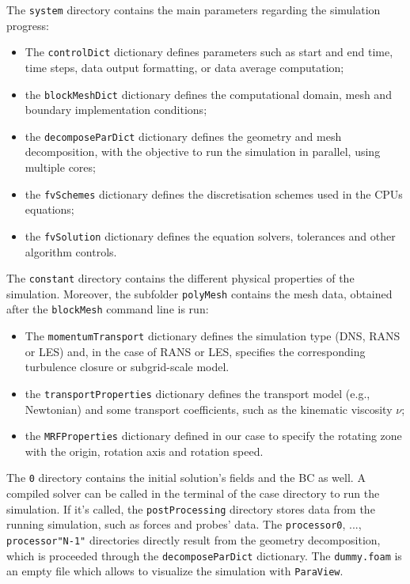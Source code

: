 The \texttt{system} directory contains the main parameters regarding the simulation progress:
\begin{itemize}
    \item[$-$] The \texttt{controlDict} dictionary defines parameters such as start and end time, time steps, data output formatting, or data average computation;
    \item[$-$] the \texttt{blockMeshDict} dictionary defines the computational domain, mesh and boundary implementation conditions;
    \item[$-$] the \texttt{decomposeParDict} dictionary defines the geometry and mesh decomposition, with the objective to run the simulation in parallel, using multiple cores;
    \item[$-$] the \texttt{fvSchemes} dictionary defines the discretisation schemes used in the \ac{CPU}s equations;
    \item[$-$] the \texttt{fvSolution} dictionary defines the equation solvers, tolerances and other algorithm controls.
\end{itemize}

The \texttt{constant} directory contains the different physical properties of the simulation. Moreover, the subfolder \texttt{polyMesh} contains the mesh data, obtained after the \texttt{blockMesh} command line is run:
\begin{itemize}
    \item[$-$] The \texttt{momentumTransport} dictionary defines the simulation type (DNS, RANS or LES) and, in the case of RANS or LES, specifies the corresponding turbulence closure or subgrid-scale model.
    \item[$-$] the \texttt{transportProperties} dictionary defines the transport model (e.g., Newtonian) and some transport coefficients, such as the kinematic viscosity $\nu$;
    \item[$-$] the \texttt{MRFProperties} dictionary defined in our case to specify the rotating zone with the origin, rotation axis and rotation speed.
\end{itemize}

The \texttt{0} directory contains the initial solution's fields and the \ac{BC} as well.
A compiled solver can be called in the terminal of the case directory to run the simulation.
If it's called, the \texttt{postProcessing} directory stores data from the running simulation, such as forces and probes' data.
The \texttt{processor0}, ..., \texttt{processor"N-1"} directories directly result from the geometry decomposition, which is proceeded through the \texttt{decomposeParDict} dictionary.
The \texttt{dummy.foam} is an empty file which allows to visualize the simulation with \texttt{ParaView}. 


